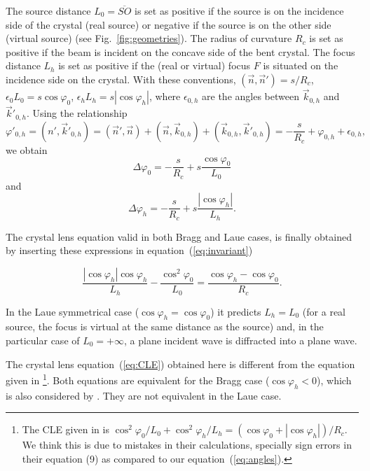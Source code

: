 \documentclass[preprint]{iucr}              %
\begin{document}
The source distance $L_0=\overline{SO}$ is set as positive if the source is on the incidence side of the crystal (real source) or negative if the source is on the other side (virtual source) (see Fig.~\ref{fig:geometries}). The radius of curvature $R_c$ is set as positive if the beam is incident on the concave side of the bent crystal. The focus distance $L_h$ is set as positive if the (real or virtual) focus $F$ is situated on the incidence side on the crystal. With these conventions, $(\vec n,\vec n')=s/R_c$, $\epsilon_0 L_0 = s \cos\varphi_0$,  $\epsilon_h L_h = s |\cos\varphi_h|$,
where $\epsilon_{0,h}$ are the angles between $\vec k_{0,h}$ and $\vec k'_{0,h}$.
Using the relationship
\begin{equation}
    \varphi'_{0,h} = 
    (n',  \vec k'_{0,h}) = 
    (\vec n', \vec n) + (\vec n,\vec k_{0,h}) + (\vec k_{0,h}, \vec k'_{0,h}) = -\frac{s}{R_c} + \varphi_{0,h} + \epsilon_{0,h},
\end{equation}
we obtain
\begin{equation}
\label{eq:angles}
\Delta \varphi_0 =  - \frac{s}{R_c} + s \frac{\cos\varphi_0}{L_0}
\end{equation}
and 
\begin{equation}
\label{eq:angles2}
\Delta \varphi_h = - \frac{s}{R_c} +  s \frac{|\cos\varphi_h|}{L_h}.
\end{equation}

The crystal lens equation valid in both Bragg and Laue cases, is finally obtained by inserting these expressions in equation~(\ref{eq:invariant})

\begin{equation}
\label{eq:CLE}
\frac{|\cos\varphi_h| \cos\varphi_h}{L_h} - \frac{\cos^2\varphi_0}{L_0} = \frac{\cos\varphi_h - \cos\varphi_0}{R_c}.
\end{equation}

In the Laue symmetrical case ($\cos\varphi_h=\cos\varphi_0$) it predicts $L_h=L_0$ (for a real source, the focus is virtual at the same distance as the source) and, in the particular case of $L_0=+\infty$, a plane incident wave is diffracted into a plane wave.

The crystal lens equation~(\ref{eq:CLE}) obtained here is different from the equation given in \cite{CK}\footnote{The CLE given in \cite{CK} is 
$
\cos^2\varphi_0/L_0 + \cos^2\varphi_h/L_h = (\cos\varphi_0 + |\cos\varphi_h|)/R_c$.
We think this is due to mistakes in their calculations, specially sign errors in their equation (9) as compared to our equation~(\ref{eq:angles}). 
}.
Both equations are equivalent for the Bragg case ($\cos\varphi_h<0$), which is also considered by . They are not equivalent in the Laue case.
 
\end{document}
